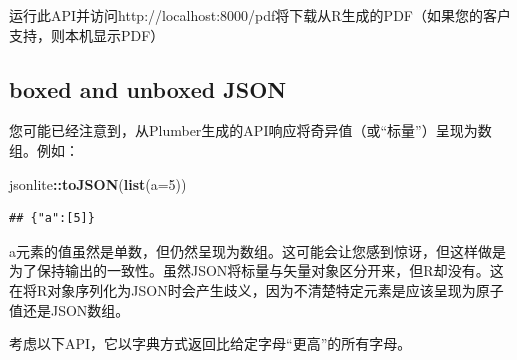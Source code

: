 \documentclass[]{book}
\newenvironment{Shaded}{\begin{snugshade}}{\end{snugshade}}
\newcommand{\KeywordTok}[1]{\textcolor[rgb]{0.13,0.29,0.53}{\textbf{#1}}}
\newcommand{\DataTypeTok}[1]{\textcolor[rgb]{0.13,0.29,0.53}{#1}}
\newcommand{\DecValTok}[1]{\textcolor[rgb]{0.00,0.00,0.81}{#1}}
\newcommand{\StringTok}[1]{\textcolor[rgb]{0.31,0.60,0.02}{#1}}
\newcommand{\CommentTok}[1]{\textcolor[rgb]{0.56,0.35,0.01}{\textit{#1}}}
\newcommand{\ControlFlowTok}[1]{\textcolor[rgb]{0.13,0.29,0.53}{\textbf{#1}}}
\newcommand{\OperatorTok}[1]{\textcolor[rgb]{0.81,0.36,0.00}{\textbf{#1}}}
\newcommand{\NormalTok}[1]{#1}
\begin{document}
\begin{Shaded}
\end{Shaded}

运行此API并访问http://localhost:8000/pdf将下载从R生成的PDF（如果您的客户支持，则本机显示PDF）

\subsection{boxed and unboxed JSON}\label{boxed-and-unboxed-json}

您可能已经注意到，从Plumber生成的API响应将奇异值（或``标量''）呈现为数组。例如：

\begin{Shaded}
\begin{Highlighting}[]
\NormalTok{jsonlite}\OperatorTok{::}\KeywordTok{toJSON}\NormalTok{(}\KeywordTok{list}\NormalTok{(}\DataTypeTok{a=}\DecValTok{5}\NormalTok{))}
\end{Highlighting}
\end{Shaded}

\begin{verbatim}
## {"a":[5]}
\end{verbatim}

a元素的值虽然是单数，但仍然呈现为数组。这可能会让您感到惊讶，但这样做是为了保持输出的一致性。虽然JSON将标量与矢量对象区分开来，但R却没有。这在将R对象序列化为JSON时会产生歧义，因为不清楚特定元素是应该呈现为原子值还是JSON数组。

考虑以下API，它以字典方式返回比给定字母``更高''的所有字母。
\end{document}

